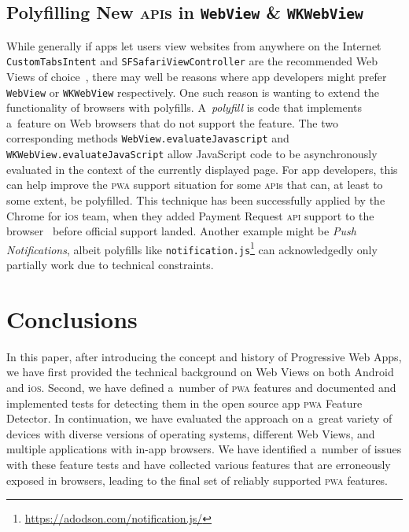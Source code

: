 \documentclass[sigconf,hyphens]{acmart}
\begin{document}
\subsection{Polyfilling New \textsc{api}s in \texttt{WebView} \& \texttt{WKWebView}}

While generally if apps let users view websites from anywhere on the Internet
\texttt{CustomTabsIntent} and \texttt{SFSafariViewController}
are the recommended Web Views of choice~\cite{apple2018sfsafariviewcontroller,kinlan2016customtabs},
there may well be reasons where app developers might prefer \texttt{WebView}
or \texttt{WKWebView} respectively.
One such reason is wanting to extend the functionality of browsers with polyfills.
A~\emph{polyfill} is code that implements a~feature on Web browsers
that do not support the feature.
The two corresponding methods \texttt{WebView.evaluateJavascript} and \texttt{WKWebView.evaluateJavaScript}
allow JavaScript code to be 
asynchronously evaluated in the context of the currently displayed page.
For app developers, this can help improve
the \textsc{pwa} support situation for some \textsc{api}s
that can, at least to some extent, be polyfilled.
This technique has been successfully applied by the Chrome for i\textsc{os} team,
when they added Payment Request \textsc{api} support to the browser~\cite{leenheer2017paymentrequest}
before official support landed.
Another example might be \emph{Push Notifications},
albeit polyfills like \texttt{notification.js}\footnote{\url{https://adodson.com/notification.js/}} 
can acknowledgedly only partially work due to technical constraints.

\section{Conclusions}
\label{sec:conclusions}

In this paper, after introducing the concept and history of Progressive Web Apps,
we have first provided the technical background on Web Views
on both Android and i\textsc{os}.
Second, we have defined a~number of \textsc{pwa} features
and documented and implemented tests for detecting them
in the open source app \textsc{pwa} Feature Detector. 
In continuation, we have evaluated the approach on a~great variety of devices
with diverse versions of operating systems, different Web Views,
and multiple applications with in-app browsers.
We have identified a~number of issues with these feature tests
and have collected various features that are erroneously exposed in browsers,
leading to the final set of reliably supported \textsc{pwa} features.
\end{document}
